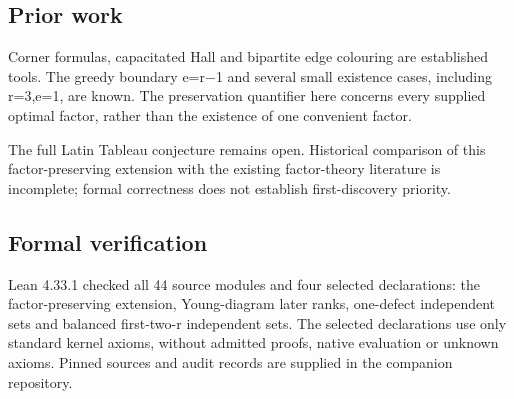 \documentclass[11pt,a4paper]{article}
\begin{document}
\subsection{Prior work}
Corner formulas, capacitated Hall and bipartite edge colouring are established tools. The greedy boundary e=r\ensuremath{-}1 and several small existence cases, including r=3,e=1, are known. The preservation quantifier here concerns every supplied optimal factor, rather than the existence of one convenient factor.

The full Latin Tableau conjecture remains open. Historical comparison of this factor-preserving extension with the existing factor-theory literature is incomplete; formal correctness does not establish first-discovery priority.

\subsection{Formal verification}
Lean 4.33.1 checked all 44 source modules and four selected declarations: the factor-preserving extension, Young-diagram later ranks, one-defect independent sets and balanced first-two-r independent sets. The selected declarations use only standard kernel axioms, without admitted proofs, native evaluation or unknown axioms. Pinned sources and audit records are supplied in the companion repository.
\end{document}
